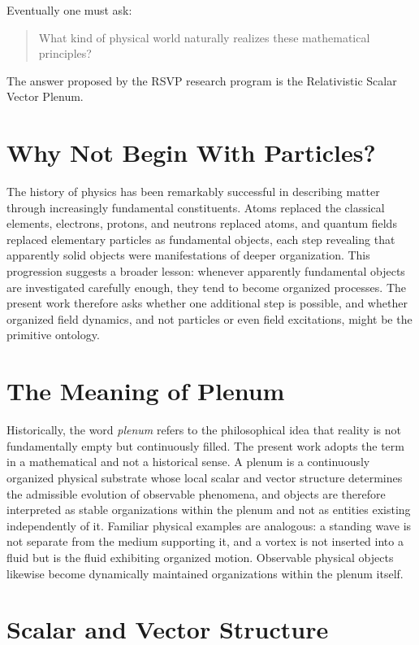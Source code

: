 \documentclass[11pt,oneside]{book}
\numberwithin{equation}{chapter}
\theoremstyle{definition}
\theoremstyle{plain}
\begin{document}
Eventually one must ask:

\begin{quote}
What kind of physical world naturally realizes these mathematical
principles?
\end{quote}

The answer proposed by the RSVP research program is the Relativistic Scalar
Vector Plenum.

\section{Why Not Begin With Particles?}

The history of physics has been remarkably successful in describing matter through increasingly fundamental constituents. Atoms replaced the classical elements, electrons, protons, and neutrons replaced atoms, and quantum fields replaced elementary particles as fundamental objects, each step revealing that apparently solid objects were manifestations of deeper organization. This progression suggests a broader lesson: whenever apparently fundamental objects are investigated carefully enough, they tend to become organized processes. The present work therefore asks whether one additional step is possible, and whether organized field dynamics, and not particles or even field excitations, might be the primitive ontology.

\section{The Meaning of Plenum}

Historically, the word \emph{plenum} refers to the philosophical idea that reality is not fundamentally empty but continuously filled. The present work adopts the term in a mathematical and not a historical sense. A plenum is a continuously organized physical substrate whose local scalar and vector structure determines the admissible evolution of observable phenomena, and objects are therefore interpreted as stable organizations within the plenum and not as entities existing independently of it. Familiar physical examples are analogous: a standing wave is not separate from the medium supporting it, and a vortex is not inserted into a fluid but is the fluid exhibiting organized motion. Observable physical objects likewise become dynamically maintained organizations within the plenum itself.

\section{Scalar and Vector Structure}
\end{document}
